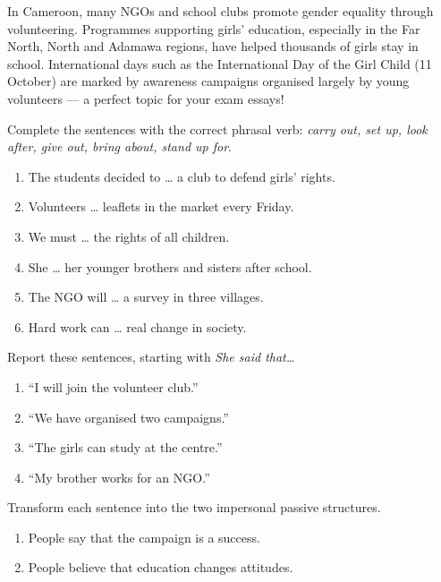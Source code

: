 \documentclass[11pt]{article}
\newcounter{popsec}
\newcounter{popsub}
\newcommand{\courssub}[1]{%
  \stepcounter{popsub}%
  \par\vspace{9pt}\noindent{\popxbold\fontsize{11.5}{13}\selectfont\color{popink}{\color{poporange}\thepopsec.\thepopsub}\hspace{6pt}#1}\par\nopagebreak\vspace{4pt}
}
\begin{document}
\begin{savaistu}
In Cameroon, many NGOs and school clubs promote gender equality through volunteering. Programmes supporting girls' education, especially in the Far North, North and Adamawa regions, have helped thousands of girls stay in school. International days such as the International Day of the Girl Child (11 October) are marked by awareness campaigns organised largely by young volunteers — a perfect topic for your exam essays!
\end{savaistu}

\courssub{Practice exercises}

\begin{exercice}
Complete the sentences with the correct phrasal verb: \emph{carry out, set up, look after, give out, bring about, stand up for}.
\begin{enumerate}
\item The students decided to \dots{} a club to defend girls' rights.
\item Volunteers \dots{} leaflets in the market every Friday.
\item We must \dots{} the rights of all children.
\item She \dots{} her younger brothers and sisters after school.
\item The NGO will \dots{} a survey in three villages.
\item Hard work can \dots{} real change in society.
\end{enumerate}
\end{exercice}

\begin{exercice}
Report these sentences, starting with \emph{She said that\dots}
\begin{enumerate}
\item ``I will join the volunteer club.''
\item ``We have organised two campaigns.''
\item ``The girls can study at the centre.''
\item ``My brother works for an NGO.''
\end{enumerate}
\end{exercice}

\begin{exercice}
Transform each sentence into the two impersonal passive structures.
\begin{enumerate}
\item People say that the campaign is a success.
\item People believe that education changes attitudes.
\end{enumerate}
\end{exercice}
\end{document}
